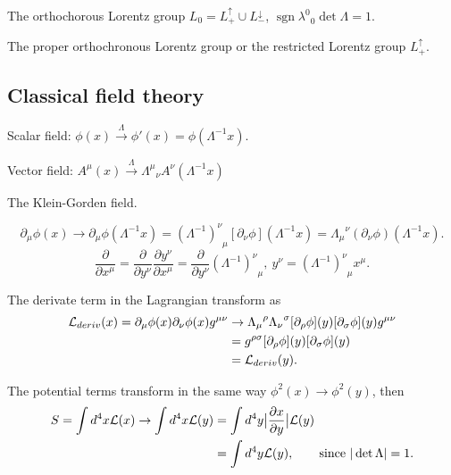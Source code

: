         \qquad \qquad The orthochorous Lorentz group $L_0 = L^{\uparrow}_+ \cup L^{\downarrow}_-$, $\operatorname{sgn}{\lambda^0}_0\det \Lambda =1$.

        \qquad \qquad The proper orthochronous Lorentz group or the restricted Lorentz group $L^{\uparrow}_+$.
       


\subsection{Classical field theory}

    \qquad Scalar field: $\phi(x) \xrightarrow{\Lambda} \phi'(x) = \phi(\Lambda^{-1}x)$.

    \qquad Vector field: $A^\mu(x) \xrightarrow{\Lambda} {\Lambda^\mu}_\nu A^\nu(\Lambda^{-1}x)$

    \begin{example}
        The Klein-Gorden field.

        $$\partial_\mu \phi(x) \rightarrow \partial_\mu \phi(\Lambda^{-1}x)= {(\Lambda^{-1})^\nu}_\mu [\partial_\nu \phi](\Lambda^{-1}x) = {\Lambda_\mu}^\nu (\partial_\nu \phi)(\Lambda^{-1}x).$$
        $$\frac{\partial}{\partial x^\mu} = \frac{\partial}{\partial y^\nu} \frac{\partial y^\nu}{\partial x^\mu} = \frac{\partial }{\partial y^\nu}{(\Lambda^{-1})^\nu}_\mu, \ y^\nu= {(\Lambda^{-1})^\nu}_\mu x^\mu.$$
    \end{example}

    \qquad The derivate term in the Lagrangian transform as
        \begin{align*}
            \mathcal{L}_{deriv}(x) = \partial_\mu \phi(x) \partial_\nu \phi(x) g^{\mu \nu} 
                    &\rightarrow {\Lambda_\mu}^\rho {\Lambda_\nu}^\sigma [\partial_\rho \phi](y) [\partial_\sigma \phi](y) g^{\mu \nu}\\
                    &= g^{\rho \sigma} [\partial_\rho \phi](y) [\partial_\sigma \phi](y)\\
                    &= \mathcal{L}_{deriv}(y).
        \end{align*}

    \qquad The potential terms transform in the same way $\phi^2(x) \rightarrow \phi^2(y)$, then
        \begin{align*}
            S = \int d^4 x \mathcal{L}(x) \rightarrow \int d^4 x \mathcal{L}(y)
                &= \int d^4 y \big\vert \frac{\partial x}{\partial y} \big\vert \mathcal{L}(y)\\
                &= \int d^4y \mathcal{L}(y), \qquad \text{since}\ \vert \det \Lambda \vert =1.
        \end{align*}
